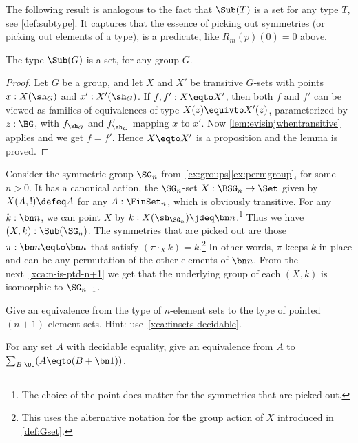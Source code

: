 The following result is analogous to the fact that $\Sub(T)$ is
a set for any type $T$, see \cref{def:subtype}. It captures
that the essence of picking out symmetries (or picking out elements
of a type), is a predicate, like $R_m(p)(0)=0$ above.

\begin{lemma}
  \label{lem:SubGisset}%
  The type $\Sub(G)$ is a set, for any group $G$.
\end{lemma}
\begin{proof}
Let $G$ be a group, and let $X$ and $X'$ be transitive $G$-sets with
points $x:X(\sh_G)$ and $x':X'(\sh_G)$. If $f,f': X\eqto X'$,
then both $f$ and $f'$ can be viewed as families of equivalences of
type $X(z) \equivto X'(z)$, parameterized by $z:\BG$,
with $f_{\sh_G}$ and $f'_{\sh_G}$ mapping $x$ to $x'$.
Now \cref{lem:evisinjwhentransitive} applies and we get $f=f'$.
Hence $X\eqto X'$ is a proposition and the lemma is proved.
\end{proof}

\begin{example}
  \label{exa:fix1subSGn}%
Consider the symmetric group $\SG_n$ from~\cref{ex:groups}\ref{ex:permgroup},
for some $n>0$. It has a canonical action,
the $\SG_n$-set $X : \BSG_n \to\Set$ given by $X(A,!)\defeq A$
for any $A:\FinSet_n$, which is obviously transitive.
For any $k:\bn n$, we can point $X$ by
$k: X(\sh_{\SG_n}) \jdeq \bn n$.\footnote{The choice of the point
does matter for the symmetries that are picked out.}
Thus we have $(X,k):\Sub(\SG_n)$.
The symmetries that are picked out are those $\pi : \bn n \eqto \bn n$
that satisfy $(\pi \cdot_X k) = k$.\footnote{%
This uses the alternative notation for the group action of $X$
introduced in \cref{def:Gset}.}
In other words, $\pi$ keeps $k$ in place and can be any permutation
of the other elements of $\bn n$.
From the next~\cref{xca:n-is-ptd-n+1}
we get that the underlying group of each $(X,k)$
is isomorphic to $\SG_{n-1}$.
\end{example}

\begin{xca}\label{xca:n-is-ptd-n+1}
  Give an equivalence from the type of
  $n$-element sets to the type of pointed $(n{+}1)$-element sets.
  Hint: use~\cref{xca:finsets-decidable}.
\end{xca}

\begin{xca} \label{xca:A-is-A-1+1}
  For any set $A$ with decidable equality,
  give an equivalence from $A$ to $\sum_{B:\UU}(A\eqto(B+\bn1))$.
\end{xca}


